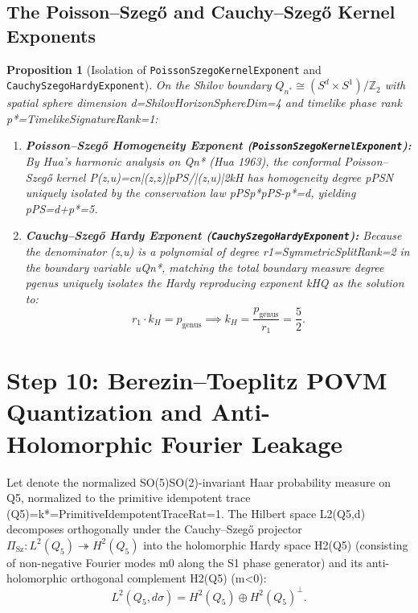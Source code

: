 \documentclass[11pt,reqno]{amsart}
\newtheorem{proposition}[theorem]{Proposition}
\theoremstyle{definition}
\theoremstyle{remark}
\newcommand{\PiSz}{\Pi_{\mathrm{Sz}}}
\begin{document}
\subsection{The Poisson--Szeg\H{o} and Cauchy--Szeg\H{o} Kernel Exponents}

\begin{proposition}[Isolation of \texttt{PoissonSzegoKernelExponent} and \texttt{CauchySzegoHardyExponent}]
\label{prop:szego_exponents}
On the Shilov boundary $Q_{n^*} \cong (S^d \times S^1)/\mathbb{Z}_2$ with spatial sphere dimension d=ShilovHorizonSphereDim=4 and timelike phase rank p*=TimelikeSignatureRank=1:
\begin{enumerate}[label=(\roman*)]
  \item \textbf{Poisson--Szeg\H{o} Homogeneity Exponent (\texttt{PoissonSzegoKernelExponent}):} By Hua's harmonic analysis on Qn* (Hua 1963), the conformal Poisson--Szeg\H{o} kernel P(z,u)=cn|(z,z)|pPS/|(z,u)|2kH has homogeneity degree pPSN uniquely isolated by the conservation law pPSp*pPS-p*=d, yielding pPS=d+p*=5.
  \item \textbf{Cauchy--Szeg\H{o} Hardy Exponent (\texttt{CauchySzegoHardyExponent}):} Because the denominator (z,u) is a polynomial of degree r1=SymmetricSplitRank=2 in the boundary variable uQn*, matching the total boundary measure degree pgenus uniquely isolates the Hardy reproducing exponent kHQ as the solution to:
  \begin{equation}
    r_1 \cdot k_H = p_{\mathrm{genus}} \implies k_H = \frac{p_{\mathrm{genus}}}{r_1} = \frac{5}{2}.
  \end{equation}
\end{enumerate}
\end{proposition}

\section{Step 10: Berezin--Toeplitz POVM Quantization and Anti-Holomorphic Fourier Leakage}

Let  denote the normalized SO(5)SO(2)-invariant Haar probability measure on Q5, normalized to the primitive idempotent trace (Q5)=k*=PrimitiveIdempotentTraceRat=1. The Hilbert space L2(Q5,d) decomposes orthogonally under the Cauchy--Szeg\H{o} projector $\PiSz : L^2(Q_5) \twoheadrightarrow H^2(Q_5)$ into the holomorphic Hardy space H2(Q5) (consisting of non-negative Fourier modes m0 along the S1 phase generator) and its anti-holomorphic orthogonal complement H2(Q5) (m<0):
\begin{equation}
  L^2(Q_5, d\sigma) = H^2(Q_5) \oplus H^2(Q_5)^\perp.
\end{equation}
\end{document}
